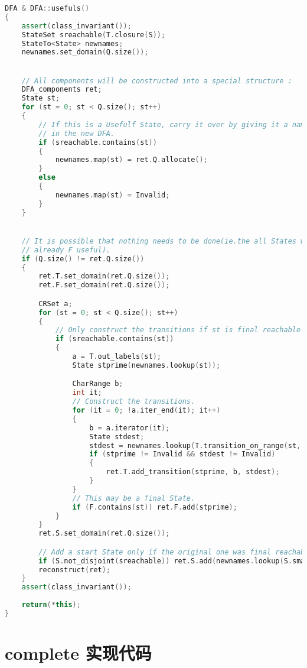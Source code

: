 \begin{lstlisting}[language=C++,label={lst:usefuls-imp},caption={文件 DFA.cpp}]
DFA & DFA::usefuls()
{
    assert(class_invariant());
    StateSet sreachable(T.closure(S));
    StateTo<State> newnames;
    newnames.set_domain(Q.size());


    // All components will be constructed into a special structure :
    DFA_components ret;
    State st;
    for (st = 0; st < Q.size(); st++)
    {
        // If this is a Usefulf State, carry it over by giving it a name
        // in the new DFA.
        if (sreachable.contains(st))
        {
            newnames.map(st) = ret.Q.allocate();
        }
        else
        {
            newnames.map(st) = Invalid;
        }
    }


    // It is possible that nothing needs to be done(ie.the all States were
    // already F useful).
    if (Q.size() != ret.Q.size())
    {
        ret.T.set_domain(ret.Q.size());
        ret.F.set_domain(ret.Q.size());

        CRSet a;
        for (st = 0; st < Q.size(); st++)
        {
            // Only construct the transitions if st is final reachable.
            if (sreachable.contains(st))
            {
                a = T.out_labels(st);
                State stprime(newnames.lookup(st));

                CharRange b;
                int it;
                // Construct the transitions.
                for (it = 0; !a.iter_end(it); it++)
                {
                    b = a.iterator(it);
                    State stdest;
                    stdest = newnames.lookup(T.transition_on_range(st, b));
                    if (stprime != Invalid && stdest != Invalid)
                    {
                        ret.T.add_transition(stprime, b, stdest);
                    }
                }
                // This may be a final State.
                if (F.contains(st)) ret.F.add(stprime);
            }
        }
        ret.S.set_domain(ret.Q.size());

        // Add a start State only if the original one was final reachable.
        if (S.not_disjoint(sreachable)) ret.S.add(newnames.lookup(S.smallest()));
        reconstruct(ret);
    }
    assert(class_invariant());
    
    return(*this);
}
\end{lstlisting}

\section{complete 实现代码}\label{sec:complete-imp}

